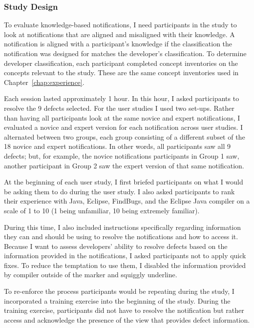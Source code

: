 \subsubsection{Study Design}

To evaluate knowledge-based notifications, I need participants in the study to look at notifications that are aligned and misaligned with their knowledge. A notification is aligned with a participant's knowledge if the classification the notification was designed for matches the developer's classification. To determine developer classification, each participant completed concept inventories on the concepts relevant to the study. These are the same concept inventories used in Chapter~\ref{chap:experience}.

Each session lasted approximately 1 hour. In this hour, I asked participants to resolve the 9 defects selected. 
For the user studies I used two set-ups.
Rather than having all participants look at the same novice and expert notifications, I evaluated a novice and expert version for each notification across user studies. I alternated between two groups, each group consisting of a different subset of the 18 novice and expert notifications. In other words, all participants saw all 9 defects; but, for example, the novice notifications participants in Group 1 saw, another participant in Group 2 saw the expert version of that same notification.

At the beginning of each user study, I first briefed participants on what I would be asking them to do during the user study. 
I also asked participants to rank their experience with Java, Eclipse, FindBugs, and the Eclipse Java compiler on a scale of 1 to 10 (1 being unfamiliar, 10 being extremely familiar). 

During this time, I also included instructions specifically regarding information they can and should be using to resolve the notifications and how to access it. Because I want to assess developers' ability to resolve defects based on the information provided in the notifications, I asked participants not to apply quick fixes. To reduce the temptation to use them, I disabled the information provided by compiler outside of the marker and squiggly underline. 

To re-enforce the process participants would be repeating during the study, I incorporated a training exercise into the beginning of the study. During the training exercise, participants did not have to resolve the notification but rather access and acknowledge the presence of the view that provides defect information.

